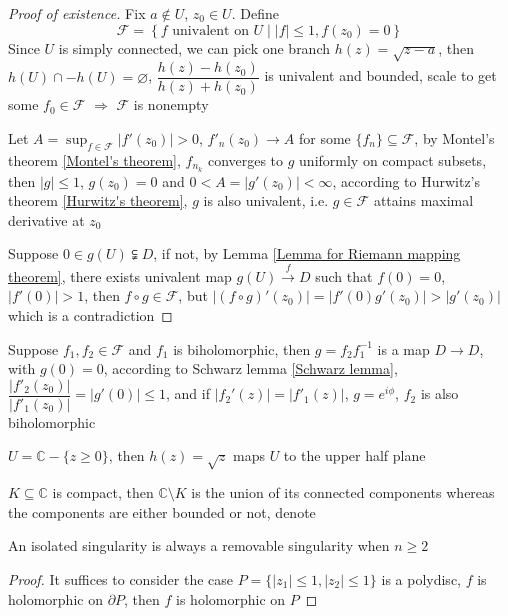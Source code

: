 \documentclass[main]{subfiles}
\begin{document}
\begin{proof}[Proof of existence]
Fix $a\notin U$, $z_0\in U$. Define
\[\mathcal F=\left\{f\text{ univalent on }U\middle||f|\leq1,f(z_0)=0\right\}\]
Since $U$ is simply connected, we can pick one branch $h(z)=\sqrt{z-a}$, then $h(U)\cap-h(U)=\varnothing$,  $\dfrac{h(z)-h(z_0)}{h(z)+h(z_0)}$ is univalent and bounded, scale to get some $f_0\in\mathcal F$ $\Rightarrow$ $\mathcal F$ is nonempty \par
Let $\displaystyle A=\sup_{f\in\mathcal F}|f'(z_0)|>0$, $f'_n(z_0)\to A$ for some $\{f_n\}\subseteq\mathcal F$, by Montel's theorem \ref{Montel's theorem}, $f_{n_k}$ converges to $g$ uniformly on compact subsets, then $|g|\leq1$, $g(z_0)=0$ and $0<A=|g'(z_0)|<\infty$, according to Hurwitz's theorem \ref{Hurwitz's theorem}, $g$ is also univalent, i.e. $g\in\mathcal F$ attains maximal derivative at $z_0$ \par
Suppose $0\in g(U)\subsetneqq D$, if not, by Lemma \ref{Lemma for Riemann mapping theorem}, there exists univalent map $g(U)\xrightarrow fD$ such that $f(0)=0$, $|f'(0)|>1$, then $f\circ g\in\mathcal F$, but $|(f\circ g)'(z_0)|=|f'(0)g'(z_0)|>|g'(z_0)|$ which is a contradiction
\end{proof}

\begin{remark}
Suppose $f_1,f_2\in\mathcal F$ and $f_1$ is biholomorphic, then $g=f_2f^{-1}_1$ is a map $D\to D$, with $g(0)=0$, according to Schwarz lemma \ref{Schwarz lemma}, $\dfrac{|f'_2(z_0)|}{|f'_1(z_0)|}=|g'(0)|\leq1$, and if $|f_2'(z)|=|f'_1(z)|$, $g=e^{i\phi}$, $f_2$ is also biholomorphic
\end{remark}

\begin{example}
$U=\mathbb C-\{z\geq0\}$, then $h(z)=\sqrt z$ maps $U$ to the upper half plane
\end{example}

\begin{theorem}
$K\subseteq \mathbb C$ is compact, then $\mathbb C\setminus K$ is the union of its connected components whereas the components are either bounded or not, denote
\end{theorem}

\begin{theorem}\label{Hartogs's extension theorem}
An isolated singularity is always a removable singularity when $n\geq2$
\end{theorem}

\begin{proof}
It suffices to consider the case $P=\{|z_1|\leq1,|z_2|\leq1\}$ is a polydisc, $f$ is holomorphic on $\partial P$, then $f$ is holomorphic on $P$
\end{proof}
\end{document}
